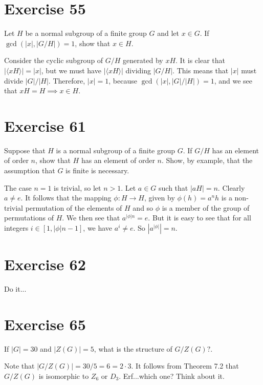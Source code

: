 \documentclass[12pt]{article}
\begin{document}
\section*{Exercise 55}

Let $H$ be a normal subgroup of a finite group $G$ and let $x\in G$.
If $\gcd(|x|,|G/H|)=1$, show that $x\in H$.

Consider the cyclic subgroup of $G/H$ generated by $xH$.
It is clear that $|\langle xH\rangle|=|x|$, but we must have
$|\langle xH\rangle|$ dividing $|G/H|$.  This means that
$|x|$ must divide $|G|/|H|$.  Therefore, $|x|=1$,
because $\gcd(|x|,|G|/|H|)=1$, and we see that
$xH=H\implies x\in H$.

\section*{Exercise 61}

Suppose that $H$ is a normal subgroup of a finite group $G$.
If $G/H$ has an element of order $n$, show that $H$ has an element of order $n$.
Show, by example, that the assumption that $G$ is finite is necessary.

The case $n=1$ is trivial, so let $n>1$.  Let $a\in G$ such that $|aH|=n$.  Clearly $a\neq e$.
It follows that the mapping $\phi:H\to H$, given by $\phi(h)=a^nh$ is a non-trivial permutation of
the elements of $H$ and so $\phi$ is a member of the group of permutations of $H$.
We then see that $a^{|\phi|n}=e$.  But it is easy to see that for all
integers $i\in [1,|\phi|n-1]$, we have $a^i\neq e$.  So $|a^{|\phi|}|=n$.

\section*{Exercise 62}

Do it...

\section*{Exercise 65}

If $|G|=30$ and $|Z(G)|=5$, what is the
structure of $G/Z(G)?$.

Note that $|G/Z(G)|=30/5=6=2\cdot 3$.
It follows from Theorem 7.2 that $G/Z(G)$
is isomorphic to $Z_6$ or $D_3$.  Erf...which one?
Think about it.
\end{document}
